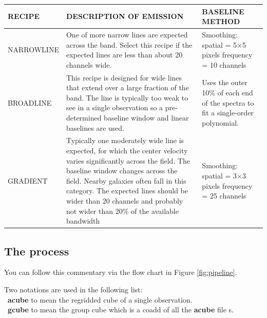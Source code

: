 \documentclass[twoside,11pt]{article}
\newcommand{\xlabel}[1]{}
\renewcommand{\_}{\texttt{\symbol{95}}}
\begin{document}
\begin{table}[h!]
\begin{tabular}{p{2.9cm}|p{7.3cm}|p{4.5cm}}
\hline
\textbf{RECIPE} & \textbf{DESCRIPTION OF EMISSION} & \textbf{BASELINE METHOD} \\
\hline
NARROWLINE & One of more narrow lines are expected across the band. Select this recipe if the expected lines are less than about 20 channels wide.& Smoothing: \newline spatial = 5$\times$5 pixels \newline frequency = 10 channels\\
\hline
BROADLINE &This recipe is designed for wide lines that extend over a large fraction of the band. The line is typically too weak to see in a single observation so a pre-determined baseline window and linear baselines are used.  &Uses the outer 10\% of each end of the spectra to fit a single-order polynomial.  \\
\hline
GRADIENT &Typically one moderately wide line is expected, for which the center velocity varies significantly across the field. The baseline window changes across the field. Nearby galaxies often fall in this category. The expected lines should be wider than 20 channels and probably not wider than 20\% of the available bandwidth  & Smoothing: \newline spatial = 3$\times$3 pixels  \newline frequency = 25 channels\\
\hline
\end{tabular}
\end{table}

\subsection{\xlabel{recipes}The process}
You can follow this commentary via the flow chart in Figure \ref{fig:pipeline}.

Two notations are used in the following list:\\
\textbullet\ \textbf{a\_cube} to mean the regridded cube of a single observation. \\
\textbullet\ \textbf{g\_cube} to mean the group cube which is a coadd of all the \textbf{a\_cube} file s.
\end{document}
